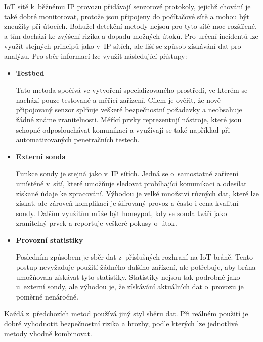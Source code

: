  IoT sítě k~běžnému IP provozu přidávají senzorové protokoly, jejichž chování je také dobré monitorovat, 
 protože jsou připojeny do počítačové sítě a mohou být zneužity při útocích. Bohužel detekční metody 
 nejsou pro tyto sítě moc rozšířené, a tím dochází ke zvýšení rizika a dopadu možných útoků. Pro určení 
 incidentů lze využít stejných principů jako v~IP sítích, ale liší se způsob získávání dat pro analýzu. 
 Pro sběr informací lze využít následující přístupy:
 \begin{itemize}
  \item \textbf{Testbed}
  
    Tato metoda spočívá ve vytvoření specializovaného prostředí, ve kterém se nachází pouze testované 
    a měřící zařízení. Cílem je ověřit, že nově připojovaný senzor splňuje veškeré bezpečnostní 
    požadavky a neobsahuje žádné známe zranitelnosti. Měřící prvky reprezentují nástroje, které 
    jsou schopné odposlouchávat komunikaci a využívají se také například při automatizovaných
    penetračních testech.   
  \item \textbf{Externí sonda}
  
  Funkce sondy je stejná jako v~IP sítích. Jedná se o~samostatné zařízení umístěné v~sítí, které
  umožňuje sledovat probíhající komunikaci a odesílat získané údaje ke zpracování. 
  Výhodou je velké množství různých  dat, které lze získat, ale zároveň komplikací je šifrovaný provoz
  a často i cena kvalitní sondy.
  Dalším využitím 
  může být honeypot, kdy se sonda tváří jako zranitelný prvek a reportuje veškeré pokusy o~útok.
    
  \item \textbf{Provozní statistiky}
  
  Posledním způsobem je sběr dat z~příslušných rozhraní na IoT bráně. Tento postup nevyžaduje použití
  žádného dalšího zařízení, ale potřebuje, aby brána umožňovala získávat tyto statistiky. 
  Statistiky nejsou tak podrobné jako u~externí sondy, ale výhodou je, 
  že získávání aktuálních dat o~provozu je poměrně nenáročné.
 \end{itemize}
 
 Každá z~předchozích metod používá jiný styl sběru dat. Při reálném použití je dobré vyhodnotit 
 bezpečnostní rizika a hrozby, podle kterých lze jednotlivé metody vhodně kombinovat.

 \newpage
